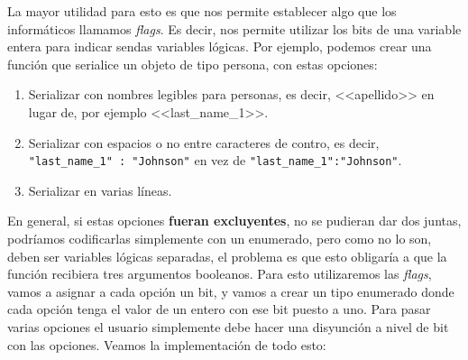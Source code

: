\documentclass[a4paper]{article}
\begin{document}
La mayor utilidad para esto es que nos permite establecer algo que los
informáticos llamamos \emph{flags}. Es decir, nos permite utilizar los bits de
una variable entera para indicar sendas variables lógicas. Por ejemplo, podemos
crear una función que serialice un objeto de tipo persona, con estas opciones:
\begin{enumerate}
\item Serializar con nombres legibles para personas, es decir,
<<apellido>> en lugar de, por ejemplo <<last\_name\_1>>.
\item Serializar con espacios o no entre caracteres de contro, es decir,
\verb!"last_name_1" : "Johnson"! en vez de \verb!"last_name_1":"Johnson"!.
\item Serializar en varias líneas.
\end{enumerate}

En general, si estas opciones \textbf{fueran excluyentes}, no se pudieran dar
dos juntas, podríamos codificarlas simplemente con un enumerado, pero como no
lo son, deben ser variables lógicas separadas, el problema es que esto
obligaría a que la función recibiera tres argumentos booleanos. Para esto
utilizaremos las \textit{flags}, vamos a asignar a cada opción un bit, y vamos
a crear un tipo enumerado donde cada opción tenga el valor de un entero
con ese bit puesto a uno. Para pasar varias opciones el usuario simplemente
debe hacer una disyunción a nivel de bit con las opciones.
Veamos la implementación de todo esto:
\end{document}
